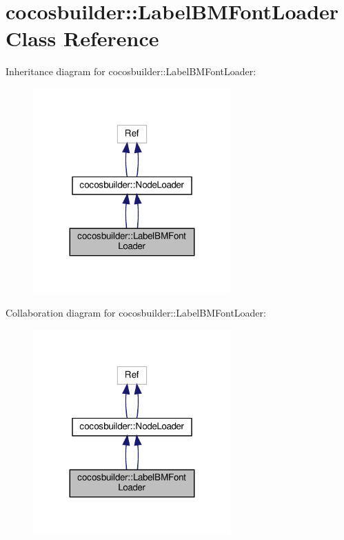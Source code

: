 \hypertarget{classcocosbuilder_1_1LabelBMFontLoader}{}\section{cocosbuilder\+:\+:Label\+B\+M\+Font\+Loader Class Reference}
\label{classcocosbuilder_1_1LabelBMFontLoader}


Inheritance diagram for cocosbuilder\+:\+:Label\+B\+M\+Font\+Loader\+:
\nopagebreak
\begin{figure}[H]
\begin{center}
\leavevmode
\includegraphics[width=215pt]{classcocosbuilder_1_1LabelBMFontLoader__inherit__graph}
\end{center}
\end{figure}


Collaboration diagram for cocosbuilder\+:\+:Label\+B\+M\+Font\+Loader\+:
\nopagebreak
\begin{figure}[H]
\begin{center}
\leavevmode
\includegraphics[width=215pt]{classcocosbuilder_1_1LabelBMFontLoader__coll__graph}
\end{center}
\end{figure}

